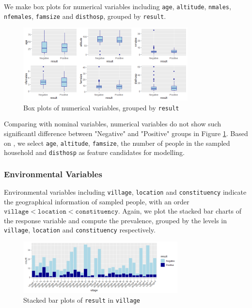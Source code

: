 \documentclass[11pt,twoside]{article}
\numberwithin{Theorem}{section}
\numberwithin{Definition}{section}
\numberwithin{Lemma}{section}
\numberwithin{Algorithm}{section}
\numberwithin{equation}{section}
\begin{document}
We make box plots for numerical variables including \texttt{age}, \texttt{altitude}, \texttt{nmales}, \texttt{nfemales}, \texttt{famsize} and \texttt{disthosp}, grouped by \texttt{result}. 

\begin{figure}[!h]
	\centering
	\includegraphics[width = 0.8\textwidth]{Images/numerical.png}
	\caption{Box plots of numerical variables, grouped by \texttt{result}}
	\label{fig:numerical}
\end{figure}

Comparing with nominal variables, numerical variables do not show such significantl difference between "Negative" and "Positive" groups in Figure \ref{fig:numerical}. Based on \cite{goarant2016leptospirosis}, we select \texttt{age}, \texttt{altitude}, \texttt{famsize}, the number of people in the sampled household and \texttt{disthosp} as feature candidates for modelling. 

\subsubsection{Environmental Variables}

Environmental variables including \texttt{village}, \texttt{location} and \texttt{constituency} indicate the geographical information of sampled people, with an order $\texttt{village} < \texttt{location} < \texttt{constituency}$.  Again, we plot the stacked bar charts of the response variable and compute the prevalence, grouped by the levels in \texttt{village}, \texttt{location} and \texttt{constituency} respectively. 

\begin{figure}[!h]
	\centering
	\includegraphics[width = 0.75\textwidth]{Images/village.png}
	\caption{Stacked bar plots of \texttt{result} in \texttt{village}}
	\label{fig:village} 
\end{figure}
\end{document}
